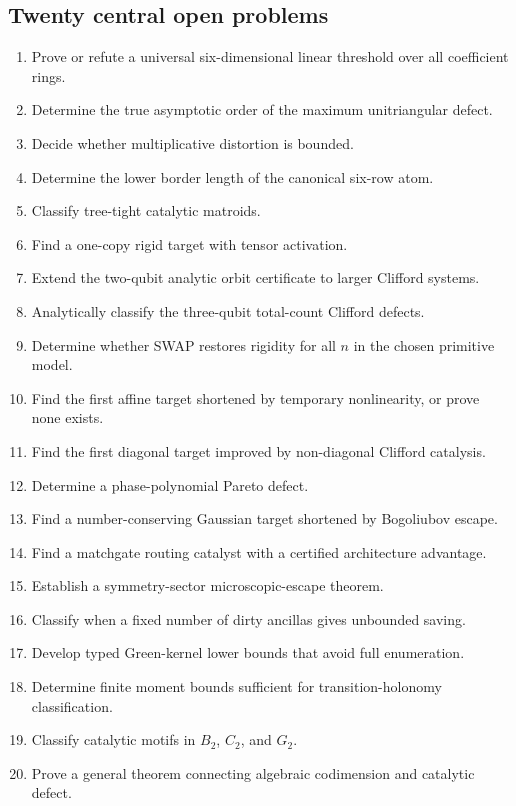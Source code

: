 \subsection{Twenty central open problems}
\begin{enumerate}
\item Prove or refute a universal six-dimensional linear threshold over all coefficient rings.
\item Determine the true asymptotic order of the maximum unitriangular defect.
\item Decide whether multiplicative distortion is bounded.
\item Determine the lower border length of the canonical six-row atom.
\item Classify tree-tight catalytic matroids.
\item Find a one-copy rigid target with tensor activation.
\item Extend the two-qubit analytic orbit certificate to larger Clifford systems.
\item Analytically classify the three-qubit total-count Clifford defects.
\item Determine whether SWAP restores rigidity for all $n$ in the chosen primitive model.
\item Find the first affine target shortened by temporary nonlinearity, or prove none exists.
\item Find the first diagonal target improved by non-diagonal Clifford catalysis.
\item Determine a phase-polynomial Pareto defect.
\item Find a number-conserving Gaussian target shortened by Bogoliubov escape.
\item Find a matchgate routing catalyst with a certified architecture advantage.
\item Establish a symmetry-sector microscopic-escape theorem.
\item Classify when a fixed number of dirty ancillas gives unbounded saving.
\item Develop typed Green-kernel lower bounds that avoid full enumeration.
\item Determine finite moment bounds sufficient for transition-holonomy classification.
\item Classify catalytic motifs in $B_2$, $C_2$, and $G_2$.
\item Prove a general theorem connecting algebraic codimension and catalytic defect.
\end{enumerate}

